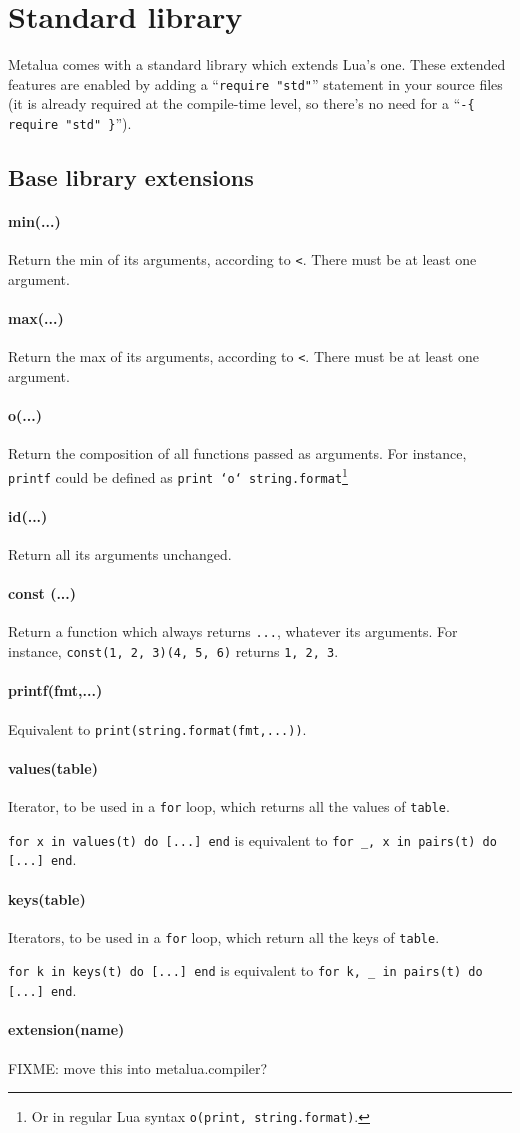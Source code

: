 \def\function#1{\paragraph{#1}}

\section{Standard library}
Metalua comes with a standard library which extends Lua's one. These
extended features are enabled by adding a ``{\tt require "std"}''
statement in your source files (it is already required at the
compile-time level, so there's no need for a 
``{\tt -\{ require "std" \}}''). 

\subsection{Base library extensions}

\function{min(...)}
Return the min of its arguments, according to {\tt<}. There must be at
least one argument.

\function{max(...)}
Return the max of its arguments, according to {\tt<}. There must be at
least one argument.

\function{o(...)}  
Return the composition of all functions passed as arguments. For
instance, {\tt printf} could be defined as {\tt print `o`
  string.format}\footnote{Or in regular Lua syntax {\tt o(print,
    string.format)}.}

\function{id(...)}
Return all its arguments unchanged.

\function{const (...)}
Return a function which always returns {\tt ...}, whatever its arguments.
For instance, {\tt const(1, 2, 3)(4, 5, 6)} returns {\tt1, 2, 3}.

\function{printf(fmt,...)}
Equivalent to {\tt print(string.format(fmt,...))}.

\function{values(table)}
Iterator, to be used in a {\tt for} loop, which returns all the values
of {\tt table}. 

{\tt for x in values(t) do [...] end} is equivalent to {\tt for \_, x in
  pairs(t) do [...] end}.

\function{keys(table)}
Iterators, to be used in a {\tt for} loop, which return all the keys
of {\tt table}. 

{\tt for k in keys(t) do [...] end} is equivalent to {\tt for k, \_ in
  pairs(t) do [...] end}.

\function{extension(name)}
FIXME: move this into metalua.compiler?


